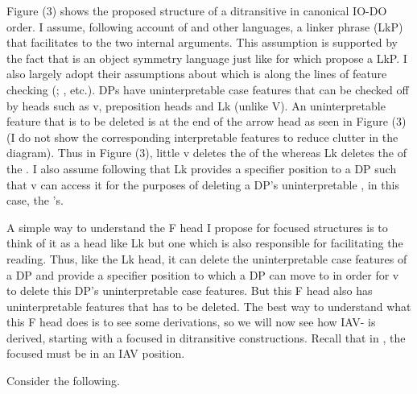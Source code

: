 \documentclass[output=paper
,newtxmath
,modfonts
,nonflat]{langsci/langscibook}
\begin{document}
Figure (3) shows the proposed structure of a ditransitive in canonical IO-DO order. I assume, following  account of  and other  languages, a linker phrase (LkP) that facilitates  to the two internal arguments. This assumption is supported by the fact that  is an object symmetry language \cite{Diercks2013} just like  for which \citet{Baker2006} propose a LkP. I also largely adopt their assumptions about  which is along the lines of feature checking (\citealt{Chomsky1995}; \citeyear{Chomsky2000}, etc.). DPs have uninterpretable case features that can be checked off by heads such as v, preposition heads and Lk (unlike V). An uninterpretable feature that is to be deleted is at the end of the arrow head as seen in Figure (3) (I do not show the corresponding interpretable features to reduce clutter in the diagram). Thus in Figure (3), little v deletes the  of the  whereas Lk deletes the  of the . I also assume following \citet{Baker2006} that Lk provides a specifier position to a DP such that v can access it for the purposes of deleting a DP’s uninterpretable , in this case, the ’s.

A simple way to understand the F head I propose for focused structures is to think of it as a head like Lk but one which is also responsible for facilitating the  reading. Thus, like the Lk head, it can delete the uninterpretable case features of a DP and provide a specifier position to which a DP can move to in order for v to delete this DP’s uninterpretable case features. But this F head also has uninterpretable  features that has to be deleted. The best way to understand what this F head does is to see some derivations, so we will now see how  IAV- is derived, starting with a focused  in ditransitive constructions. Recall that in , the focused  must be in an IAV position.   

Consider the following. 
\end{document}
